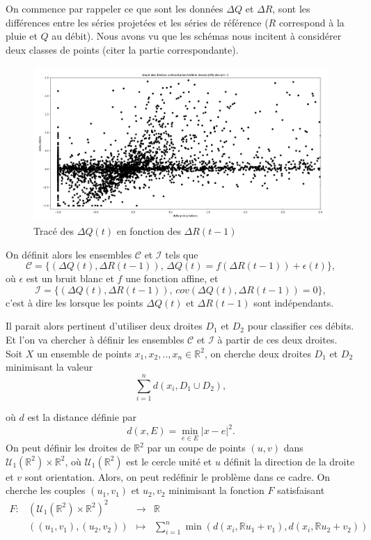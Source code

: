 \documentclass[a4paper,11pt]{article}
\numberwithin{equation}{section}
\begin{document}
On commence par rappeler ce que sont les données $\Delta Q$ et $\Delta R$, sont les différences entre les séries projetées et les séries de référence ($R$ correspond à la pluie et $Q$ au débit). Nous avons vu  que les schémas nous incitent à considérer deux classes de points (citer la partie correspondante).
\begin{figure}[H]
	\label{fig-deb delta Q delta R }
	\begin{center}
		\includegraphics[scale=0.28]{deb_prec_dec1.png}
	\end{center}
	\caption{Tracé des $\Delta Q(t)$ en fonction des $\Delta R(t-1)$}
\end{figure}

On définit alors les ensembles $\mathcal{C}$ et $\mathcal{I}$ tels que
\[\mathcal{C}=\{(\Delta Q(t),\Delta R(t-1)), \, \Delta Q(t)= f(\Delta R(t-1))+\epsilon(t)\},\]
où $\epsilon$ est un bruit blanc et $f$ une fonction affine, et
\[\mathcal{I}= \{(\Delta Q(t),\Delta R(t-1)), \, cov(\Delta Q(t),\Delta R(t-1))=0\},\]
c'est à dire les lorsque les points $\Delta Q(t)$ et $\Delta R(t-1)$ sont indépendants.  

Il parait alors pertinent d'utiliser deux droites $D_1$ et $D_2$ pour classifier ces débits. Et l'on va chercher à définir les ensembles $\mathcal{C}$ et $\mathcal{I}$ à partir de ces deux droites.
Soit $X$ un ensemble de points  $x_1, x_2, .., x_n \in \mathbb{R}^2$, on cherche deux droites $D_1$ et $D_2$ minimisant la valeur
\[\sum_{i=1}^{n}d(x_i, D_1 \cup D_2),\]

où $d$ est la distance définie par 
\[d(x,E)= \min_{e \in E} |x-e|^2.\]
On peut définir les droites de $\mathbb{R}^2$ par un coupe de points $(u,v)$ dans $\mathcal{U}_1(\mathbb{R}^2)\times\mathbb{R}^2$, où $\mathcal{U}_1(\mathbb{R}^2)$ est le cercle unité et $u$ définit la direction de la droite et $v$ sont orientation. Alors, on peut redéfinir le problème dans ce cadre. On cherche les couples $(u_1,v_1)$ et $u_2,v_2$ minimisant la fonction $F$ satisfaisant 
\begin{equation}
	\label{F}
	\begin{array}{cccc}
		F: & (\mathcal{U}_1(\mathbb{R}^2)\times\mathbb{R}^2)^2 &\to &\mathbb{R}\\
		& ((u_1,v_1), (u_2,v_2)) & \mapsto & \sum_{i=1}^{n}\min (d(x_i,\mathbb{R}u_1+v_1), d(x_i,\mathbb{R}u_2+v_2))
	\end{array}
\end{equation}
\end{document}
